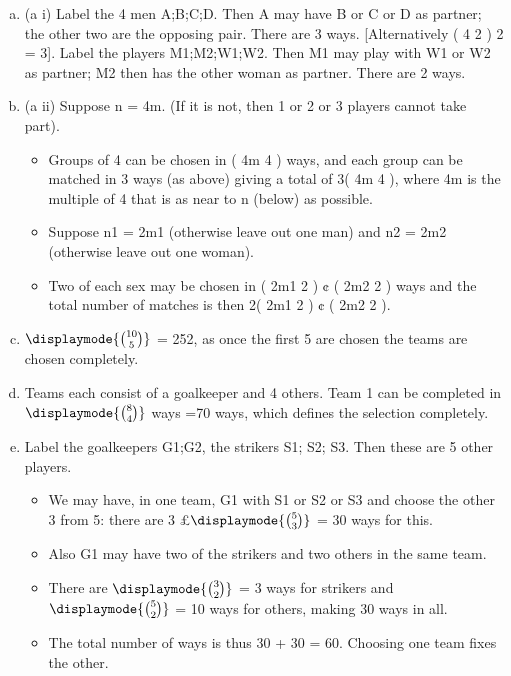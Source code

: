 \documentclass[a4paper,12pt]{article}
\begin{document}
\begin{enumerate}[(a)]
\item (a i) Label the 4 men A;B;C;D. Then A may have B or C or D as partner; the
other two are the opposing pair. There are 3 ways. [Alternatively
( 4
2 )
2
= 3].
Label the players M1;M2;W1;W2. Then M1 may play with W1 or W2 as
partner; M2 then has the other woman as partner. There are 2 ways.
\item (a ii) Suppose n = 4m. (If it is not, then 1 or 2 or 3 players cannot take part).
\begin{itemize}
\item Groups of 4 can be chosen in ( 4m
4 ) ways, and each group can be matched
in 3 ways (as above) giving a total of 3( 4m
4 ), where 4m is the multiple of 4
that is as near to n (below) as possible.
\item Suppose n1 = 2m1 (otherwise leave out one man) and n2 = 2m2 (otherwise
leave out one woman).
\item Two of each sex may be chosen in ( 2m1
2 ) ¢ ( 2m2
2 ) ways and the total number
of matches is then 2( 2m1
2 ) ¢ ( 2m2
2 ).
\end{itemize}
\item $\displaymode{ {10 \choose 5}}$ = 252, as once the first 5 are chosen the teams are chosen completely.

\item Teams each consist of a goalkeeper and 4 others. Team 1 can be completed
in $\displaymode{ {8 \choose 4}}$  ways =70 ways, which defines the selection completely.
\item  Label the goalkeepers G1;G2, the strikers S1; S2; S3. Then these are 5 other
players.


\begin{itemize}
    \item We may have, in one team, G1 with S1 or S2 or S3 and choose the other 3 from 5: there are 3 £$\displaymode{ {5 \choose 3}}$ = 30 ways for this. 
    \item  Also G1 may have two of the strikers and two others in the same team.
    \item There are $\displaymode{ {3 \choose 2}}$  = 3 ways for
strikers and$\displaymode{ {5 \choose 2}}$ = 10 ways for others, making 30 ways in all. 
    \item The total number of ways is thus 30 + 30 = 60. Choosing one team fixes the other.
\end{itemize}
\end{enumerate}
\end{document}
